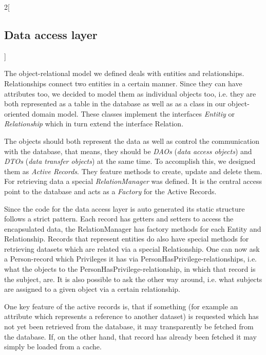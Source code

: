 \begin{multicols}{2}[\subsection{Data access layer}]

The object-relational model we defined deals with entities and relationships. Relationships connect two entities in a certain manner. Since they can have attributes too, we decided to model them as individual objects too, i.e. they are both represented as a table in the database as well as as a class in our object-oriented domain model. These classes implement the interfaces \emph{Entitiy} or \emph{Relationship} which in turn extend the interface Relation.

The objects should both represent the data as well as control the communication with the database, that means, they should be \emph{DAOs} (\emph{data access objects}) and \emph{DTOs} (\emph{data transfer objects}) at the same time. To accomplish this, we designed them as \emph{Active Records}. They feature methods to create, update and delete them. For retrieving data a special \emph{RelationManager} was defined. It is the central access point to the database and acts as a \emph{Factory} for the Active Records.

Since the code for the data access layer is auto generated its static structure follows a strict pattern. Each record has getters and setters to access the encapsulated data, the RelationManager has factory methods for each Entity and Relationship. Records that represent entities do also have special methods for retrieving datasets which are related via a special Relationship. One can now ask a Person-record which Privileges it has via PersonHasPrivilege-relationships, i.e. what the objects to the PersonHasPrivilege-relationship, in which that record is the subject, are. It is also possible to ask the other way around, i.e. what subjects are assigned to a given object via a certain relationship.

One key feature of the active records is, that if something (for example an attribute which represents a reference to another dataset) is requested which has not yet been retrieved from the database, it may transparently be fetched from the database. If, on the other hand, that record has already been fetched it may simply be loaded from a cache.


\end{multicols}
